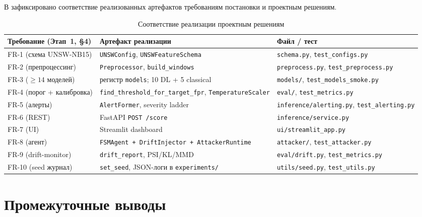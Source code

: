 \documentclass[14pt, a4paper]{extarticle}
\begin{document}
В  зафиксировано соответствие реализованных
артефактов требованиям постановки и проектным решениям.

\begin{table}[H]
\centering
\caption{Соответствие реализации проектным решениям}
\label{tab:traceability}
\renewcommand{\arraystretch}{1.2}
\small
\begin{tabularx}{\linewidth}{@{}lXl@{}}
\toprule
\textbf{Требование (Этап~1, §4)} & \textbf{Артефакт реализации} & \textbf{Файл / тест} \\
\midrule
FR-1 (схема UNSW-NB15) & \texttt{UNSWConfig}, \texttt{UNSWFeatureSchema} & \texttt{schema.py}, \texttt{test\_configs.py} \\
FR-2 (препроцессинг) & \texttt{Preprocessor}, \texttt{build\_windows} & \texttt{preprocess.py}, \texttt{test\_preprocess.py} \\
FR-3 (\(\geq 14\) моделей) & регистр \texttt{models}; 10 DL + 5 classical & \texttt{models/}, \texttt{test\_models\_smoke.py} \\
FR-4 (порог + калибровка) & \texttt{find\_threshold\_for\_target\_fpr}, \texttt{TemperatureScaler} & \texttt{eval/}, \texttt{test\_metrics.py} \\
FR-5 (алерты) & \texttt{AlertFormer}, severity ladder & \texttt{inference/alerting.py}, \texttt{test\_alerting.py} \\
FR-6 (REST) & FastAPI \texttt{POST /score} & \texttt{inference/service.py} \\
FR-7 (UI) & Streamlit dashboard & \texttt{ui/streamlit\_app.py} \\
FR-8 (агент) & \texttt{FSMAgent + DriftInjector + AttackerRuntime} & \texttt{attacker/}, \texttt{test\_attacker.py} \\
FR-9 (drift-monitor) & \texttt{drift\_report}, PSI/KL/MMD & \texttt{eval/drift.py}, \texttt{test\_metrics.py} \\
FR-10 (seed журнал) & \texttt{set\_seed}, JSON-логи в \texttt{experiments/} & \texttt{utils/seed.py}, \texttt{test\_utils.py} \\
\bottomrule
\end{tabularx}
\end{table}

\section{Промежуточные выводы}
\end{document}
